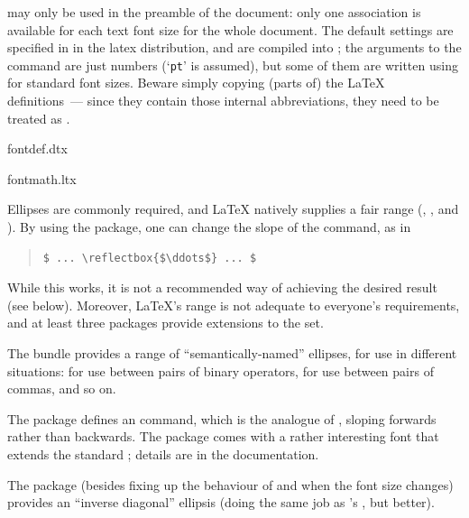  may only be used in the preamble of the
document: only one association is available for each text font size
for the whole document.  The default settings are specified in
 in the latex distribution, and are compiled into
; the arguments to the command are just numbers
(`\texttt{pt}' is assumed), but some of them are written using
 for standard font sizes.
Beware simply copying (parts of) the \LaTeX{} definitions~--- since
they contain those internal abbreviations, they need to be treated as
.
\begin{ctanrefs}
\item[fontdef.dtx]
\item[fontmath.ltx]
\end{ctanrefs}


Ellipses are commonly required, and \LaTeX{} natively supplies a fair
range (, ,  and ).  By using
the  package, one can change the slope of the
 command, as in
\begin{quote}
\begin{verbatim}
$ ... \reflectbox{$\ddots$} ... $
\end{verbatim}
\end{quote}
While this works, it is not a recommended way of achieving the desired
result (see below).  Moreover, \LaTeX{}'s range is not adequate to
everyone's requirements, and at least three packages provide
extensions to the set.

The \AMSLaTeX{} bundle provides a range of ``semantically-named''
ellipses, for use in different situations:  for use between
pairs of binary operators,  for use between pairs of commas,
and so on.

The  package defines an  command, which is
the analogue of , sloping forwards rather than backwards.
The  package comes with a rather interesting font that
extends the standard ; details are in the documentation.

The  package (besides fixing up the behaviour of
\AllTeX{}  and  when the font size changes)
provides an ``inverse diagonal'' ellipsis  (doing the same
job as 's , but better).

